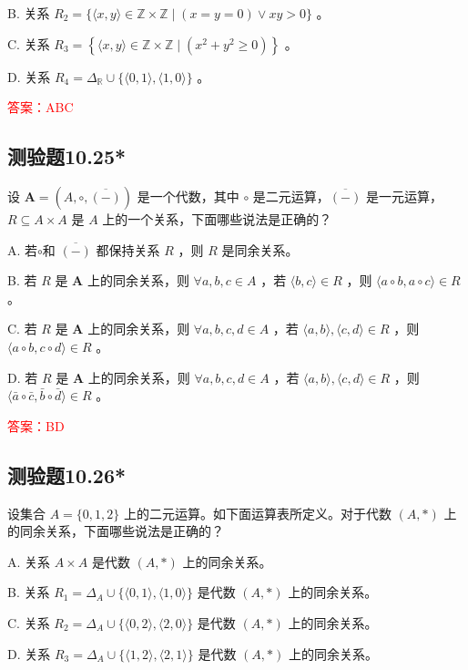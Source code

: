 \documentclass[UTF8, heading=true]{ctexart}
\begin{document}
B. 关系 $R_2=\{\langle x, y\rangle \in \mathbb{Z} \times \mathbb{Z} \mid(x=y=0) \vee x y>0\}$ 。

C. 关系 $R_3=\left\{\langle x, y\rangle \in \mathbb{Z} \times \mathbb{Z} \mid\left(x^2+y^2 \geq 0\right)\right\}$ 。

D. 关系 $R_4=\Delta_{\mathbb{R}} \cup\{\langle 0,1\rangle,\langle 1,0\rangle\}$ 。


\textcolor{red}{答案：ABC}

\subsection{测验题10.25*}

设 $\mathbf{A}=(A, \circ, \overline{(-)})$ 是一个代数，其中 $\circ$ 是二元运算，$\overline{(-)}$ 是一元运算，$R \subseteq A \times A$ 是 $A$ 上的一个关系，下面哪些说法是正确的？

A. 若$\circ$和 $\overline{(-)}$ 都保持关系 $R$ ，则 $R$ 是同余关系。

B. 若 $R$ 是 $\mathbf{A}$ 上的同余关系，则 $\forall a, b, c \in A$ ，若 $\langle b, c\rangle \in R$ ，则 $\langle a \circ b, a \circ c\rangle \in R$ 。

C. 若 $R$ 是 $\mathbf{A}$ 上的同余关系，则 $\forall a, b, c, d \in A$ ，若 $\langle a, b\rangle,\langle c, d\rangle \in R$ ，则 $\langle a \circ b, c \circ d\rangle \in R$ 。

D. 若 $R$ 是 $\mathbf{A}$ 上的同余关系，则 $\forall a, b, c, d \in A$ ，若 $\langle a, b\rangle,\langle c, d\rangle \in R$ ，则 $\langle\bar{a} \circ \bar{c}, \bar{b} \circ \bar{d}\rangle \in R$ 。


\textcolor{red}{答案：BD}

\subsection{测验题10.26*}

设集合 $A=\{0,1,2\}$ 上的二元运算。如下面运算表所定义。对于代数 $(A, *)$ 上的同余关系，下面哪些说法是正确的？

A. 关系 $A \times A$ 是代数 $(A, *)$ 上的同余关系。

B. 关系 $R_1=\Delta_A \cup\{\langle 0,1\rangle,\langle 1,0\rangle\}$ 是代数 $(A, *)$ 上的同余关系。

C. 关系 $R_2=\Delta_A \cup\{\langle 0,2\rangle,\langle 2,0\rangle\}$ 是代数 $(A, *)$ 上的同余关系。

D. 关系 $R_3=\Delta_A \cup\{\langle 1,2\rangle,\langle 2,1\rangle\}$ 是代数 $(A, *)$ 上的同余关系。
\end{document}
